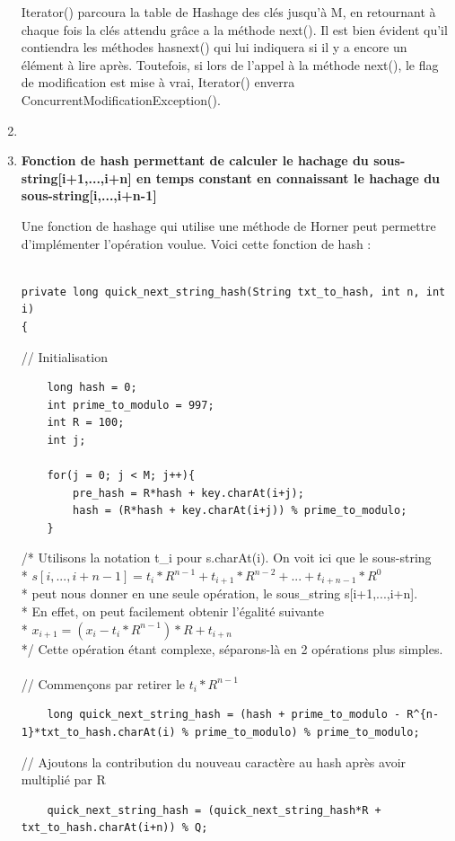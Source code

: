 \documentclass[11pt]{article}
\begin{document}
\begin{enumerate}
Iterator() parcoura la table de Hashage des clés jusqu'à M, en retournant à chaque fois la clés attendu grâce a la méthode next(). Il est bien évident qu'il contiendra les méthodes hasnext() qui lui indiquera si il y a encore un élément à lire après. Toutefois, si lors de l'appel à la méthode next(), le flag de modification est mise à vrai, Iterator() enverra ConcurrentModificationException().

\item 
\item \textbf{Fonction de hash permettant de calculer le hachage du sous-string[i+1,...,i+n] en temps constant en connaissant le hachage du sous-string[i,...,i+n-1]}

Une fonction de hashage qui utilise une méthode de Horner peut permettre d'implémenter
l'opération voulue.
Voici cette fonction de hash :

\begin{lstlisting}

private long quick_next_string_hash(String txt_to_hash, int n, int i)
{
\end{lstlisting}
	// Initialisation
\begin{lstlisting}
	long hash = 0;
	int prime_to_modulo = 997;
	int R = 100;
	int j;
	
	for(j = 0; j < M; j++){
		pre_hash = R*hash + key.charAt(i+j);
		hash = (R*hash + key.charAt(i+j)) % prime_to_modulo;
	}
\end{lstlisting}
	/* Utilisons la notation t\_i pour s.charAt(i). On voit ici que le sous-string \\
	 * $ s[i,...,i+n-1] = t_{i}*R^{n-1} + t_{i+1}*R^{n-2} + ... + t_{i+n-1}*R^{0} $ \\
	 * peut nous donner en une seule opération, le sous\_string s[i+1,...,i+n]. \\
	 * En effet, on peut facilement obtenir l'égalité suivante \\
	 * $ x_{i+1} = (x_{i} - t_{i}*R^{n-1})*R + t_{i+n} $ \\
	 */ Cette opération étant complexe, séparons-là en 2 opérations plus simples. \\
	\\
	// Commençons par retirer le $ t_{i}*R^{n-1} $
\begin{lstlisting}
	long quick_next_string_hash = (hash + prime_to_modulo - R^{n-1}*txt_to_hash.charAt(i) % prime_to_modulo) % prime_to_modulo;

\end{lstlisting}
	// Ajoutons la contribution du nouveau caractère au hash après avoir multiplié par R
\begin{lstlisting}
	quick_next_string_hash = (quick_next_string_hash*R + txt_to_hash.charAt(i+n)) % Q;
	

\end{lstlisting}
\end{enumerate}
\end{document}

